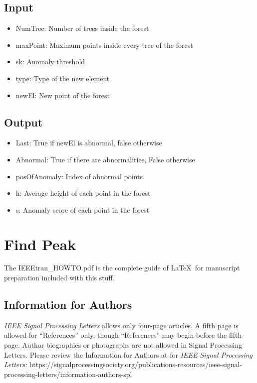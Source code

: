 \documentclass[journal]{IEEEtran}
\begin{document}
\subsection{Input}
\begin{itemize}
\item NumTree: Number of trees inside the forest 
\item maxPoint: Maximum points inside every tree of the forest 
\item sk: Anomaly threshold 
\item type: Type of the new element 
\item newEl: New point of the forest 
\end{itemize}

\subsection{Output}

\begin{itemize}
\item Last: True if newEl is abnormal, false otherwise
\item Abnormal: True if there are abnormalities, False otherwise
\item posOfAnomaly: Index of abnormal points
\item h: Average height of each point in the forest
\item s: Anomaly score of each point in the forest
\end{itemize}


\section{Find Peak}


The IEEEtran\_HOWTO.pdf is the complete guide of \LaTeX\ for manuscript preparation included with this stuff. 


\subsection{Information for Authors}

{\em IEEE Signal Processing Letters} allows only four-page articles. A fifth page is allowed for ``References'' only, though ``References'' may begin before the fifth page. Author biographies or photographs are not allowed in Signal Processing Letters. Please review the Information for Authors at for {\em IEEE Signal Processing Letters:} https://signalprocessingsociety.org/publications-resources/ieee-signal-processing-letters/information-authors-spl
\end{document}
